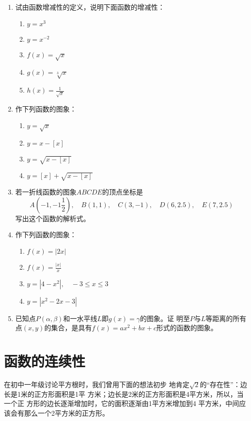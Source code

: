 \begin{ex}
\begin{enumerate}
    \item 试由函数增减性的定义，说明下面函数的增减性：
    \begin{multicols}{2}
\begin{enumerate}
    \item $y=x^3$
    \item $y=x^{-2}$
    \item $f(x)=\sqrt{x}$
    \item $g(x)=\sqrt[3]{x}$
    \item $h(x)=\frac{1}{\sqrt{x}}$
\end{enumerate}        
    \end{multicols}

    \item 作下列函数的图象：
    \begin{multicols}{2}
        \begin{enumerate}   
\item $y=\sqrt{x}$
\item $y=x-[x]$
\item $y=\sqrt{x-[x]}$
\item $y=[x]+\sqrt{x-[x]}  $
        \end{enumerate}        
    \end{multicols}
    \item 若一折线函数的图象$ABCDE$的顶点坐标是
\[A\left(-1,-1\frac{1}{2}\right),\quad B(1,1),\quad C(3,-1),\quad D(6,2.5),\quad E(7,2.5)\]    
写出这个函数的解析式。

\item 作下列函数的图象：
\begin{multicols}{2}
    \begin{enumerate}  
\item $f(x)=|2x|$
\item $f(x)=\frac{|x|}{x}$
\item $y=|4-x^2|,\quad -3\le x\le 3$
\item $y=|x^2-2x-3|$
\end{enumerate}        
\end{multicols}
\item 已知点$P(\alpha,\beta)$和一水平线$L$即$g(x)=\gamma$的图象。证
明至$P$与$L$等距离的所有点$(x,y)$的集合，是具有$f(x)=
ax^2+bx+c$形式的函数的图象。
\end{enumerate}
\end{ex}

\section{函数的连续性}
在初中一年级讨论平方根时，我们曾用下面的想法初步
地肯定$\sqrt{2}$的“存在性”：边长是1米的正方形面积是1平
方米；边长是2米的正方形面积是4平方米，所以，当一个正
方形的边长逐渐增加时，它的面积逐渐由1平方米增加到4
平方米，中间应该会有那么一个2平方米的正方形。


